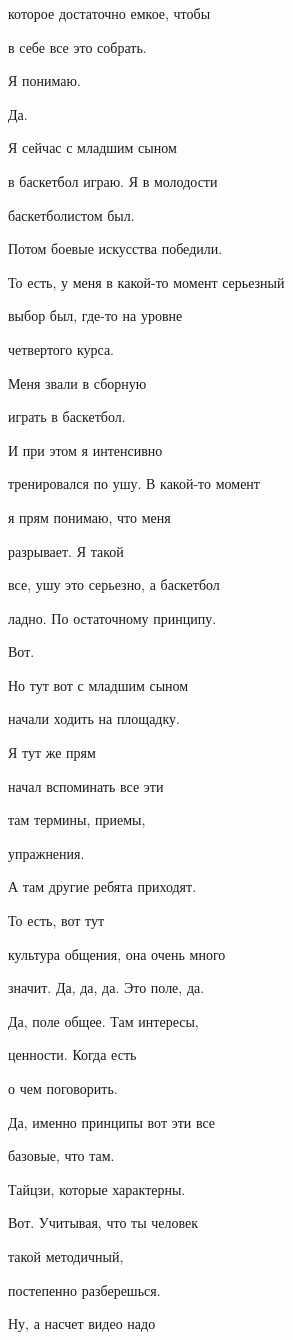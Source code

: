 которое достаточно емкое, чтобы

в себе все это собрать.

Я понимаю.

Да.

Я сейчас с младшим сыном

в баскетбол играю. Я в молодости

баскетболистом был.

Потом боевые искусства победили.

То есть, у меня в какой-то момент серьезный

выбор был, где-то на уровне

четвертого курса.

Меня звали в сборную

играть в баскетбол.

И при этом я интенсивно

тренировался по ушу. В какой-то момент

я прям понимаю, что меня

разрывает. Я такой

все, ушу это серьезно, а баскетбол

ладно. По остаточному принципу.

Вот.

Но тут вот с младшим сыном

начали ходить на площадку.

Я тут же прям

начал вспоминать все эти

там термины, приемы,

упражнения.

А там другие ребята приходят.

То есть, вот тут

культура общения, она очень много

значит. Да, да, да. Это поле, да.

Да, поле общее. Там интересы,

ценности. Когда есть

о чем поговорить.

Да, именно принципы вот эти все

базовые, что там.

Тайцзи, которые характерны.

Вот. Учитывая, что ты человек

такой методичный,

постепенно разберешься.

Ну, а насчет видео надо

